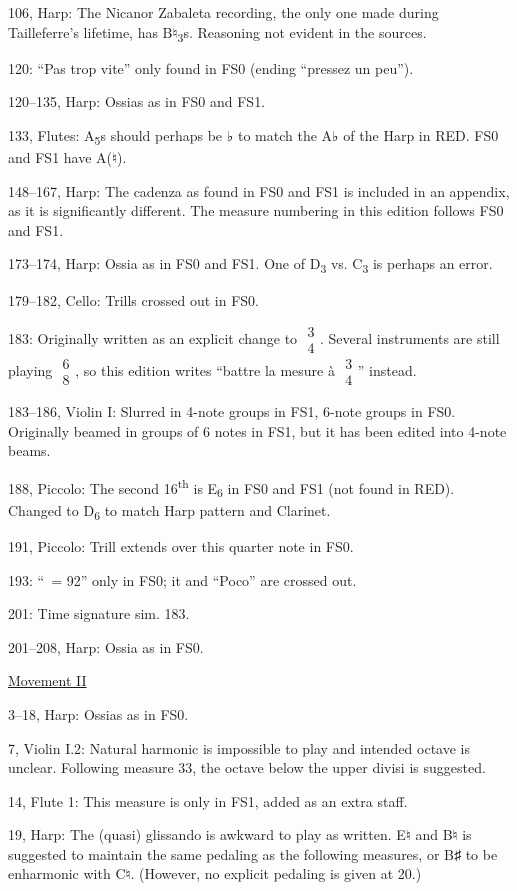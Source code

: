 \documentclass[twoside]{article}
\begin{document}
\begin{hangparas}{15pt}{1}
\begin{multicols}{2}
106, Harp: The Nicanor Zabaleta recording, the only one made during Tailleferre's lifetime, has B♮\textsubscript{3}s. Reasoning not evident in the sources.

120: ``Pas trop vite'' only found in FS0 (ending ``pressez un peu'').

120--135, Harp: Ossias as in FS0 and FS1.

133, Flutes: A\textsubscript{5}s should perhaps be ♭ to match the A♭ of the Harp in RED. FS0 and FS1 have A(♮).

148--167, Harp: The cadenza as found in FS0 and FS1 is included in an appendix, as it is significantly different. The measure numbering in this edition follows FS0 and FS1.

173--174, Harp: Ossia as in FS0 and FS1. One of D\textsubscript{3} vs. C\textsubscript{3} is perhaps an error.

179--182, Cello: Trills crossed out in FS0.

183: Originally written as an explicit change to $\substack{3\\4}$. Several instruments are still playing $\substack{6\\8}$, so this edition writes ``battre la mesure à $\substack{3\\4}$'' instead.

183--186, Violin I: Slurred in 4-note groups in FS1, 6-note groups in FS0. Originally beamed in groups of 6 notes in FS1, but it has been edited into 4-note beams.

188, Piccolo: The second 16\textsuperscript{th} is E\textsubscript{6} in FS0 and FS1 (not found in RED). Changed to D\textsubscript{6} to match Harp pattern and Clarinet.

191, Piccolo: Trill extends over this quarter note in FS0.

193: ``\Vier\ = 92'' only in FS0; it and ``Poco'' are crossed out.

201: Time signature sim. 183.

201--208, Harp: Ossia as in FS0.

\underline{Movement II}

3--18, Harp: Ossias as in FS0.

7, Violin I.2: Natural harmonic is impossible to play and intended octave is unclear. Following measure 33, the octave below the upper divisi is suggested.

14, Flute 1: This measure is only in FS1, added as an extra staff.

19, Harp: The (quasi) glissando is awkward to play as written. E♮ and B♮ is suggested to maintain the same pedaling as the following measures, or B♯ to be enharmonic with C♮. (However, no explicit pedaling is given at 20.)


\end{multicols}
\end{hangparas}
\end{document}
